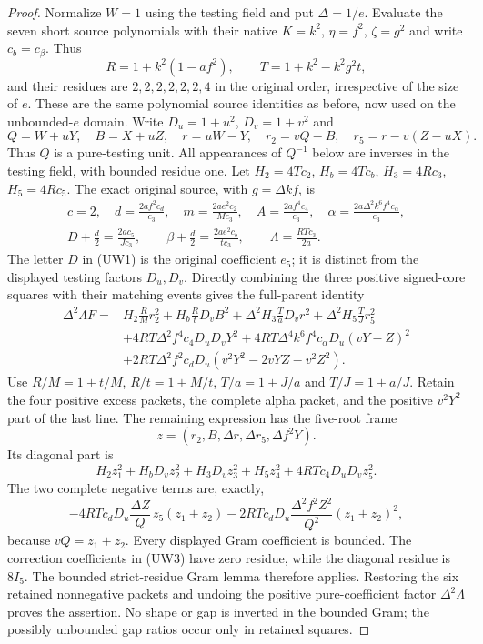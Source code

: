 \begin{proof}
Normalize $W=1$ using the testing field and put $\Delta=1/e$.
Evaluate the seven short source polynomials with their native
$K=k^2$, $\eta=f^2$, $\zeta=g^2$ and write $c_b=c_\beta$.
Thus
\[
 R=1+k^2(1-af^2),\qquad T=1+k^2-k^2g^2t,
\]
and their residues are $2,2,2,2,2,2,4$ in the original order,
irrespective of the size of $e$.  These are the same polynomial source
identities as before, now used on the unbounded-$e$ domain.
Write $D_u=1+u^2$, $D_v=1+v^2$ and
\[
 Q=W+uY,\quad B=X+uZ,\quad r=uW-Y,\quad
 r_2=vQ-B,\quad r_5=r-v(Z-uX).
\]
Thus $Q$ is a pure-testing unit.  All appearances of $Q^{-1}$ below
are inverses in the testing field, with bounded residue one.
Let $H_2=4Tc_2$, $H_b=4Tc_b$, $H_3=4Rc_3$, $H_5=4Rc_5$.
The exact original source, with $g=\Delta kf$, is
\[
\begin{gathered}
c=2,\quad d=\frac{2af^2c_d}{c_3},\quad
m=\frac{2ae^2c_2}{Mc_3},\quad
A=\frac{2af^4c_4}{c_3},\quad
\alpha=\frac{2a\Delta^2k^6f^4c_\alpha}{c_3},\\
D+\frac d2=\frac{2ac_5}{Jc_3},\qquad
\beta+\frac d2=\frac{2ae^2c_b}{tc_3},\qquad
\Lambda=\frac{RTc_3}{2a}.
\end{gathered}                                                    \tag{UW1}
\]
The letter $D$ in (UW1) is the original coefficient $e_5$; it is
distinct from the displayed testing factors $D_u,D_v$.
Directly combining the three positive signed-core squares with their
matching events gives the full-parent identity
\[
\begin{split}
\Delta^2\Lambda F={}&
 H_2\frac RM r_2^2+H_b\frac RtD_vB^2
 +\Delta^2H_3\frac TaD_vr^2
 +\Delta^2H_5\frac TJr_5^2\\
&+4RT\Delta^2f^4c_4D_uD_vY^2
 +4RT\Delta^4k^6f^4c_\alpha D_u(vY-Z)^2\\
&+2RT\Delta^2f^2c_dD_u
       (v^2Y^2-2vYZ-v^2Z^2).
\end{split}                                                       \tag{UW2}
\]
Use $R/M=1+t/M$, $R/t=1+M/t$, $T/a=1+J/a$ and
$T/J=1+a/J$.  Retain the four positive excess packets, the complete
alpha packet, and the positive $v^2Y^2$ part of the last line.
The remaining expression has the five-root frame
\[
 z=(r_2,B,\Delta r,\Delta r_5,\Delta f^2Y).
\]
Its diagonal part is
\[
 H_2z_1^2+H_bD_vz_2^2+H_3D_vz_3^2+H_5z_4^2
       +4RTc_4D_uD_vz_5^2.
\]
The two complete negative terms are, exactly,
\[
 -4RTc_dD_u\frac{\Delta Z}{Q}\,z_5(z_1+z_2)
 -2RTc_dD_u\frac{\Delta^2f^2Z^2}{Q^2}(z_1+z_2)^2,       \tag{UW3}
\]
because $vQ=z_1+z_2$.  Every displayed Gram coefficient is bounded.
The correction coefficients in (UW3) have zero residue, while the
diagonal residue is $8I_5$.  The bounded strict-residue Gram lemma
therefore applies.  Restoring the six retained nonnegative packets and
undoing the positive pure-coefficient factor $\Delta^2\Lambda$ proves
the assertion.  No shape or gap is inverted in the bounded Gram;
the possibly unbounded gap ratios occur only in retained squares.
\end{proof}

